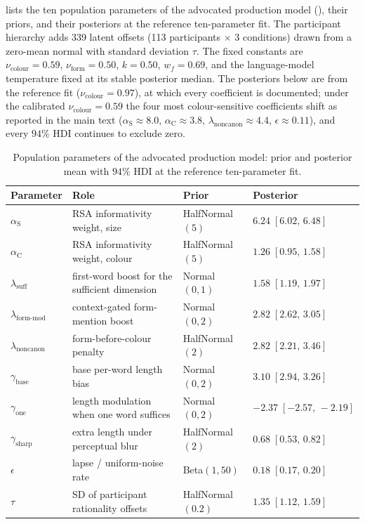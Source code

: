 \documentclass[man,floatsintext]{apa7}
\begin{document}
 lists the ten population parameters of the advocated production model (), their priors, and their posteriors at the reference ten-parameter fit.
The participant hierarchy adds 339 latent offsets (113 participants $\times$ 3 conditions) drawn from a zero-mean normal with standard deviation $\tau$.
The fixed constants are $\nu_\text{colour}=0.59$, $\nu_\text{form}=0.50$, $k=0.50$, $w_f=0.69$, and the language-model temperature fixed at its stable posterior median.
The posteriors below are from the reference fit ($\nu_\text{colour}=0.97$), at which every coefficient is documented; under the calibrated $\nu_\text{colour}=0.59$ the four most colour-sensitive coefficients shift as reported in the main text ($\alpha_\text{S}\!\approx\!8.0$, $\alpha_\text{C}\!\approx\!3.8$, $\lambda_\text{noncanon}\!\approx\!4.4$, $\epsilon\!\approx\!0.11$), and every $94\%$ HDI continues to exclude zero.

\begin{table}[htbp]
\centering
\caption{Population parameters of the advocated production model: prior and posterior mean with $94\%$ HDI at the reference ten-parameter fit.}
\label{tab:param-inventory}
\small
\begin{tabular}{llll}
\hline
Parameter & Role & Prior & Posterior \\
\hline
$\alpha_\text{S}$ & RSA informativity weight, size & HalfNormal$(5)$ & $6.24\;[6.02,\,6.48]$ \\
$\alpha_\text{C}$ & RSA informativity weight, colour & HalfNormal$(5)$ & $1.26\;[0.95,\,1.58]$ \\
$\lambda_\text{suff}$ & first-word boost for the sufficient dimension & Normal$(0,1)$ & $1.58\;[1.19,\,1.97]$ \\
$\lambda_\text{form-mod}$ & context-gated form-mention boost & Normal$(0,2)$ & $2.82\;[2.62,\,3.05]$ \\
$\lambda_\text{noncanon}$ & form-before-colour penalty & HalfNormal$(2)$ & $2.82\;[2.21,\,3.46]$ \\
$\gamma_\text{base}$ & base per-word length bias & Normal$(0,2)$ & $3.10\;[2.94,\,3.26]$ \\
$\gamma_\text{one}$ & length modulation when one word suffices & Normal$(0,2)$ & $-2.37\;[-2.57,\,-2.19]$ \\
$\gamma_\text{sharp}$ & extra length under perceptual blur & HalfNormal$(2)$ & $0.68\;[0.53,\,0.82]$ \\
$\epsilon$ & lapse / uniform-noise rate & Beta$(1,50)$ & $0.18\;[0.17,\,0.20]$ \\
$\tau$ & SD of participant rationality offsets & HalfNormal$(0.2)$ & $1.35\;[1.12,\,1.59]$ \\
\hline
\end{tabular}
\end{table}
\end{document}
